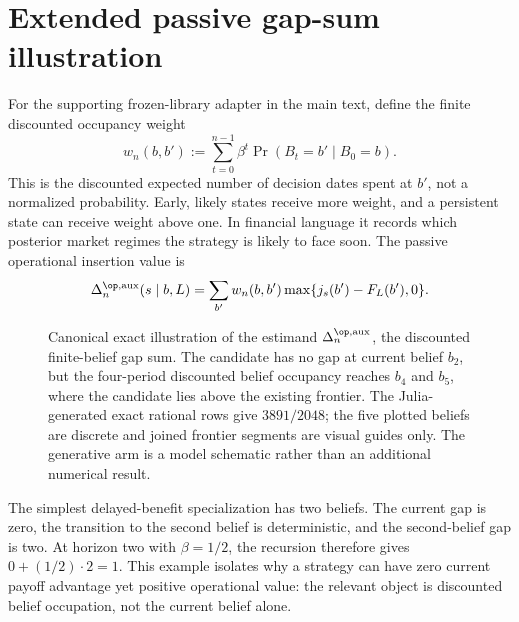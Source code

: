 \section{Extended passive gap-sum illustration}

For the supporting frozen-library adapter in the main text, define the finite
discounted occupancy weight
\[
  w_n(b,b'):=\sum_{t=0}^{n-1}\beta^t
    \Pr(B_t=b'\mid B_0=b).
\]
This is the discounted expected number of decision dates spent at \(b'\), not
a normalized probability.  Early, likely states receive more weight, and a
persistent state can receive weight above one.  In financial language it
records which posterior market regimes the strategy is likely to face soon.
The passive operational insertion value is
\[
  \Delta_n^{\op,\mathrm{aux}}(s\mid b,L)
  =\sum_{b'}w_n(b,b')\max\{j_s(b')-F_L(b'),0\}.
\]

\begin{figure}[ht]
  \centering
  
  \caption{Canonical exact illustration of the estimand
  \(\Delta_n^{\op,\mathrm{aux}}\), the discounted finite-belief gap sum.  The
  candidate has no gap at current belief \(b_2\), but the four-period
  discounted belief occupancy reaches \(b_4\) and \(b_5\), where the
  candidate lies above the existing frontier.  The Julia-generated exact
  rational rows give \(3891/2048\); the five plotted beliefs are discrete and
  joined frontier segments are visual guides only.  The generative arm is a
  model schematic rather than an additional numerical result.}
\end{figure}

The simplest delayed-benefit specialization has two beliefs.  The current
gap is zero, the transition to the second belief is deterministic, and the
second-belief gap is two.  At horizon two with \(\beta=1/2\), the recursion
therefore gives \(0+(1/2)\cdot2=1\).  This example isolates why a strategy can
have zero current payoff advantage yet positive operational value: the
relevant object is discounted belief occupation, not the current belief
alone.
